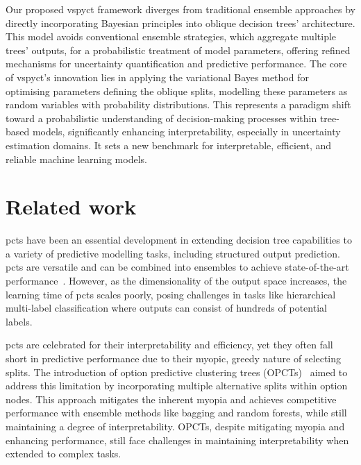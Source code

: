 \documentclass[3p,review,authoryear]{elsarticle}
\begin{document}
Our proposed \gls{vspyct} framework diverges from traditional ensemble approaches by directly incorporating Bayesian principles into oblique decision trees' architecture.
This model avoids conventional ensemble strategies, which aggregate multiple trees' outputs, for a probabilistic treatment of model parameters, offering refined mechanisms for uncertainty quantification and predictive performance.
The core of \gls{vspyct}'s innovation lies in applying the variational Bayes method for optimising parameters defining the oblique splits, modelling these parameters as random variables with probability distributions.
This represents a paradigm shift toward a probabilistic understanding of decision-making processes within tree-based models, significantly enhancing interpretability, especially in uncertainty estimation domains.
It sets a new benchmark for interpretable, efficient, and reliable machine learning models.


\section{Related work}


\Glspl{pct} have been an essential development in extending decision tree capabilities to a variety of predictive modelling tasks, including structured output prediction.
\Glspl{pct} are versatile and can be combined into ensembles to achieve state-of-the-art performance~\citep{Kocev_2013}.
However, as the dimensionality of the output space increases, the learning time of \glspl{pct} scales poorly, posing challenges in tasks like hierarchical multi-label classification where outputs can consist of hundreds of potential labels.

\Glspl{pct} are celebrated for their interpretability and efficiency, yet they often fall short in predictive performance due to their myopic, greedy nature of selecting splits.
The introduction of option predictive clustering trees (OPCTs)~\citep{Stepisnik_2020} aimed to address this limitation by incorporating multiple alternative splits within option nodes.
This approach mitigates the inherent myopia and achieves competitive performance with ensemble methods like bagging and random forests, while still maintaining a degree of interpretability.
OPCTs, despite mitigating myopia and enhancing performance, still face challenges in maintaining interpretability when extended to complex tasks.
\end{document}
